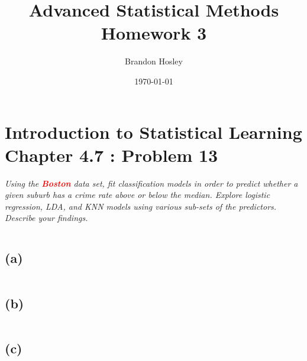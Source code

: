 \documentclass[a4paper,man,natbib]{apa6}
\title{Advanced Statistical Methods Homework 3}
\author{Brandon Hosley}
\date{\today}
\affiliation{University of Illinois - Springfield}
\begin{document}
\maketitle
\singlespacing

\section{Introduction to Statistical Learning \\ Chapter 4.7 : Problem 13}
\emph{
Using the \textbf{\textcolor{red}{Boston}} data set, 
fit classification models in order to predict
whether a given suburb has a crime rate above or below the median.
Explore logistic regression, LDA, and KNN models using various sub-sets of the predictors. Describe your findings.}

\begin{verbatim}
\end{verbatim}

\subsection{(a)} 
\emph{ }
\begin{verbatim}
\end{verbatim}

\subsection{(b)}
\emph{ }
\begin{verbatim}
\end{verbatim}

\subsection{(c)}
\emph{ }
\begin{verbatim}
\end{verbatim}
	
\end{document}
